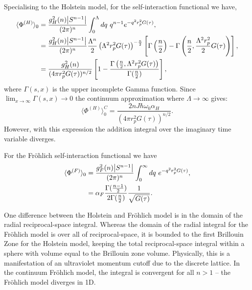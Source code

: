 Specialising to the Holstein model, for the self-interaction functional we have,
\begin{equation}
    \begin{aligned}
        \langle \Phi^{(H)} \rangle_0 &= \frac{g^2_H(n) \abs{S^{n-1}}}{(2\pi)^n} \int_0^{\Lambda} dq\ q^{n-1} e^{-q^2 r_p^2 G(\tau)} , \\
        &= \frac{g^2_H(n) \abs{S^{n-1}}}{(2\pi)^n} \frac{\Lambda^n}{2} \left(\Lambda^2 r_p^2 G(\tau) \right)^{-\frac{n}{2}} \left[ \Gamma\left(\frac{n}{2}\right) - \Gamma\left(\frac{n}{2}, \frac{\Lambda^2 r_p^2}{2} G(\tau) \right) \right], \\
        &= \frac{g_H^2(n)}{(4\pi r_p^2 G(\tau))^{n/2}} \left[1 - \frac{\Gamma\left(\frac{n}{2}, \Lambda^2 r_p^2 G(\tau) \right)}{\Gamma(\frac{n}{2})} \right], 
    \end{aligned}
\end{equation}
where $\Gamma(s, x)$ is the upper incomplete Gamma function. Since $\lim_{x\to\infty} \Gamma(s, x) \to 0$ the continuum approximation where $\Lambda \to \infty$ gives:
\begin{equation}
    \langle \Phi^{(H)} \rangle_0^C = \frac{2 n J \hbar \omega_0 \alpha_H}{(4\pi r^2_p G(\tau))^{n/2}}.
\end{equation}
However, with this expression the addition integral over the imaginary time variable diverges.
\newline

For the Fr\"ohlich self-interaction functional we have
\begin{equation}
    \begin{aligned}
        \langle\Phi^{(F)}\rangle_0 &= \frac{g^2_F(n) \abs{S^{n-1}}}{(2\pi)^n} \int_0^{\infty} dq\ e^{-q^2 r_p^2 G(\tau)} , \\
        &= \alpha_F \frac{\Gamma(\frac{n-1}{2})}{2 \Gamma(\frac{n}{2})} \frac{1}{\sqrt{G(\tau)}}.
    \end{aligned}
\end{equation}

One difference between the Holstein and Fr\"ohlich model is in the domain of the radial reciprocal-space integral. Whereas the domain of the radial integral for the Fr\"ohlich model is over all of reciprocal-space, it is bounded to the first Brillouin Zone for the Holstein model, keeping the total reciprocal-space integral within a sphere with volume equal to the Brillouin zone volume. Physically, this is a manifestation of an ultraviolet momentum cutoff due to the discrete lattice. In the continuum Fr\"ohlich model, the integral is convergent for all $n > 1$ – the Fr\"ohlich model diverges in 1D.
\newline

